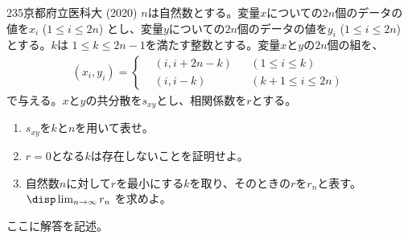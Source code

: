 \begin{thm}{235}{}{京都府立医科大 (2020)}
 $n$は自然数とする。変量$x$についての$2n$個のデータの値を$x_i$ ($1\le i\le 2n$) とし、変量$y$についての$2n$個のデータの値を$y_i$ ($1\le i\le 2n$) とする。$k$は $1\le k\le 2n-1$を満たす整数とする。変量$x$と$y$の$2n$個の組を、
 \begin{align*}
  (x_i,y_i)=\left\{
  \begin{aligned}
   &(i,i+2n-k) & &(1\le i\le k) \\
   &(i,i-k) & &(k+1\le i\le 2n)
  \end{aligned}
  \right.
 \end{align*}
 で与える。$x$と$y$の共分散を$s_{xy}$とし、相関係数を$r$とする。
 \begin{enumerate}
  \item $s_{xy}$を$k$と$n$を用いて表せ。
  \item $r=0$となる$k$は存在しないことを証明せよ。
  \item 自然数$n$に対して$r$を最小にする$k$を取り、そのときの$r$を$r_n$と表す。$\disp \lim_{n\to\infty} r_n$ を求めよ。
 \end{enumerate}
\end{thm}

ここに解答を記述。